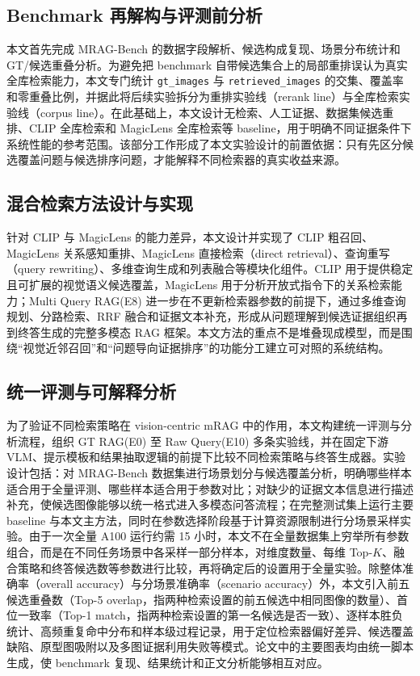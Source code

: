 \subsection{Benchmark 再解构与评测前分析}

本文首先完成 MRAG-Bench 的数据字段解析、候选构成复现、场景分布统计和 GT/候选重叠分析。为避免把 benchmark 自带候选集合上的局部重排误认为真实全库检索能力，本文专门统计 \texttt{gt\_images} 与 \texttt{retrieved\_images} 的交集、覆盖率和零重叠比例，并据此将后续实验拆分为重排实验线（rerank line）与全库检索实验线（corpus line）。在此基础上，本文设计无检索、人工证据、数据集候选重排、CLIP 全库检索和 MagicLens 全库检索等 baseline，用于明确不同证据条件下系统性能的参考范围。该部分工作形成了本文实验设计的前置依据：只有先区分候选覆盖问题与候选排序问题，才能解释不同检索器的真实收益来源。

\subsection{混合检索方法设计与实现}

针对 CLIP 与 MagicLens 的能力差异，本文设计并实现了 CLIP 粗召回、MagicLens 关系感知重排、MagicLens 直接检索（direct retrieval）、查询重写（query rewriting）、多维查询生成和列表融合等模块化组件。CLIP 用于提供稳定且可扩展的视觉语义候选覆盖，MagicLens 用于分析开放式指令下的关系检索能力；Multi Query RAG(E8) 进一步在不更新检索器参数的前提下，通过多维查询规划、分路检索、RRF 融合和证据文本补充，形成从问题理解到候选证据组织再到终答生成的完整多模态 RAG 框架。本文方法的重点不是堆叠现成模型，而是围绕“视觉近邻召回”和“问题导向证据排序”的功能分工建立可对照的系统结构。

\subsection{统一评测与可解释分析}

为了验证不同检索策略在 vision-centric mRAG 中的作用，本文构建统一评测与分析流程，组织 GT RAG(E0) 至 Raw Query(E10) 多条实验线，并在固定下游 VLM、提示模板和结果抽取逻辑的前提下比较不同检索策略与终答生成器。实验设计包括：对 MRAG-Bench 数据集进行场景划分与候选覆盖分析，明确哪些样本适合用于全量评测、哪些样本适合用于参数对比；对缺少的证据文本信息进行描述补充，使候选图像能够以统一格式进入多模态问答流程；在完整测试集上运行主要 baseline 与本文主方法，同时在参数选择阶段基于计算资源限制进行分场景采样实验。由于一次全量 A100 运行约需 15 小时，本文不在全量数据集上穷举所有参数组合，而是在不同任务场景中各采样一部分样本，对维度数量、每维 Top-$K$、融合策略和终答候选数等参数进行比较，再将确定后的设置用于全量实验。除整体准确率（overall accuracy）与分场景准确率（scenario accuracy）外，本文引入前五候选重叠数（Top-5 overlap，指两种检索设置的前五候选中相同图像的数量）、首位一致率（Top-1 match，指两种检索设置的第一名候选是否一致）、逐样本胜负统计、高频重复命中分布和样本级过程记录，用于定位检索器偏好差异、候选覆盖缺陷、原型图吸附以及多图证据利用失败等模式。论文中的主要图表均由统一脚本生成，使 benchmark 复现、结果统计和正文分析能够相互对应。

